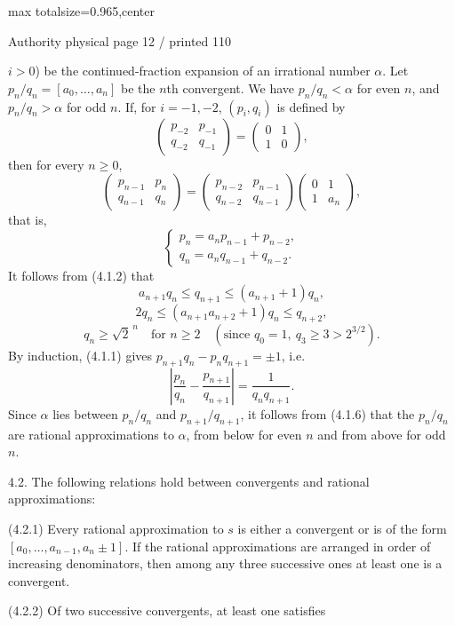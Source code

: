 \documentclass{article}
\begin{document}
\newpage
\noindent\begin{adjustbox}{max totalsize={\textwidth}{0.965\textheight},center}\begin{minipage}{\textwidth}
\noindent\hfill\scriptsize Authority physical page 12 / printed 110\par\normalsize
\(i>0\)) be the continued-fraction expansion of an irrational number \(\alpha\). Let \(p_n/q_n=[a_0,\ldots,a_n]\) be the \(n\)th convergent. We have \(p_n/q_n<\alpha\) for even \(n\), and \(p_n/q_n>\alpha\) for odd \(n\). If, for \(i=-1,-2\), \((p_i,q_i)\) is defined by
\[
\begin{pmatrix}p_{-2}&p_{-1}\\q_{-2}&q_{-1}\end{pmatrix}
=\begin{pmatrix}0&1\\1&0\end{pmatrix},
\]
then for every \(n\geq0\),
\[
\tag{4.1.1}
\begin{pmatrix}p_{n-1}&p_n\\q_{n-1}&q_n\end{pmatrix}
=\begin{pmatrix}p_{n-2}&p_{n-1}\\q_{n-2}&q_{n-1}\end{pmatrix}
\begin{pmatrix}0&1\\1&a_n\end{pmatrix},
\]
that is,
\[
\tag{4.1.2}
\begin{cases}
p_n=a_np_{n-1}+p_{n-2},\\
q_n=a_nq_{n-1}+q_{n-2}.
\end{cases}
\]
It follows from (4.1.2) that
\[
\tag{4.1.3}a_{n+1}q_n\leq q_{n+1}\leq(a_{n+1}+1)q_n,
\]
\[
\tag{4.1.4}2q_n\leq(a_{n+1}a_{n+2}+1)q_n\leq q_{n+2},
\]
\[
\tag{4.1.5}q_n\geq\sqrt{2}^{\,n}\quad\text{for }n\geq2\quad(\text{since }q_0=1,\ q_3\geq3>2^{3/2}).
\]
By induction, (4.1.1) gives \(p_{n+1}q_n-p_nq_{n+1}=\pm1\), i.e.
\[
\tag{4.1.6}
\left|\frac{p_n}{q_n}-\frac{p_{n+1}}{q_{n+1}}\right|=\frac1{q_nq_{n+1}}.
\]
Since \(\alpha\) lies between \(p_n/q_n\) and \(p_{n+1}/q_{n+1}\), it follows from (4.1.6) that the \(p_n/q_n\) are rational approximations to \(\alpha\), from below for even \(n\) and from above for odd \(n\).

4.2. The following relations hold between convergents and rational approximations:

(4.2.1) Every rational approximation to \(s\) is either a convergent or is of the form \([a_0,\ldots,a_{n-1},a_n\pm1]\). If the rational approximations are arranged in order of increasing denominators, then among any three successive ones at least one is a convergent.

(4.2.2) Of two successive convergents, at least one satisfies
\end{minipage}\end{adjustbox}
\end{document}
